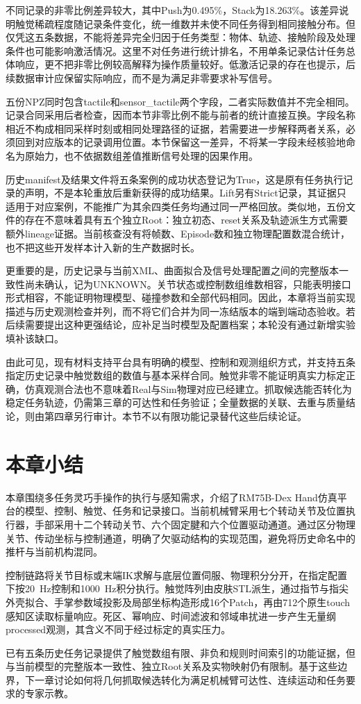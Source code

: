 不同记录的非零比例差异较大，其中Push为0.495\%，Stack为18.263\%。该差异说明触觉稀疏程度随记录条件变化，统一维数并未使不同任务得到相同接触分布。但仅凭这五条数据，不能将差异完全归因于任务类型：物体、轨迹、接触阶段及处理条件也可能影响激活情况。这里不对任务进行统计排名，不用单条记录估计任务总体响应，更不把非零比例较高解释为操作质量较好。低激活记录的存在也提示，后续数据审计应保留实际响应，而不是为满足非零要求补写信号。

五份NPZ同时包含tactile和sensor\_tactile两个字段，二者实际数值并不完全相同。记录合同采用后者检查，因而本节非零比例不能与前者的统计直接互换。字段名称相近不构成相同采样时刻或相同处理路径的证据，若需要进一步解释两者关系，必须回到对应版本的记录调用位置。本节保留这一差异，不将某一字段未经核验地命名为原始力，也不依据数组差值推断信号处理的因果作用。

历史manifest及结果文件将五条案例的成功状态登记为True，这是原有任务执行记录的声明，不是本轮重放后重新获得的成功结果。Lift另有Strict记录，其证据只适用于对应案例，不能推广为其余四类任务均通过同一严格回放。类似地，五份文件的存在不意味着具有五个独立Root：独立初态、reset关系及轨迹派生方式需要额外lineage证据。当前核查没有将帧数、Episode数和独立物理配置数混合统计，也不把这些开发样本计入新的生产数据时长。

更重要的是，历史记录与当前XML、曲面拟合及信号处理配置之间的完整版本一致性尚未确认，记为UNKNOWN。关节状态或控制数组维数相容，只能表明接口形式相容，不能证明物理模型、碰撞参数和全部代码相同。因此，本章将当前实现描述与历史观测检查并列，而不将它们合并为同一冻结版本的端到端动态验收。若后续需要提出这种更强结论，应补足当时模型及配置档案；本轮没有通过新增实验填补该缺口。

由此可见，现有材料支持平台具有明确的模型、控制和观测组织方式，并支持五条指定历史记录中触觉数组的数值与基本采样合同。触觉非零不能证明真实力标定正确，仿真观测合法也不意味着Real与Sim物理对应已经建立。抓取候选能否转化为稳定任务轨迹，仍需第三章的可达性和任务验证；全量数据的关联、去重与质量结论，则由第四章另行审计。本节不以有限功能记录替代这些后续论证。

\section{本章小结}
\label{sec:platform_summary}

本章围绕多任务灵巧手操作的执行与感知需求，介绍了RM75B-Dex Hand仿真平台的模型、控制、触觉、任务和记录接口。当前机械臂采用七个转动关节及位置执行器，手部采用十二个转动关节、六个固定腱和六个位置驱动通道。通过区分物理关节、传动坐标与控制通道，明确了欠驱动结构的实现范围，避免将历史命名中的推杆与当前机构混同。

控制链路将关节目标或末端IK求解与底层位置伺服、物理积分分开，在指定配置下按20~Hz控制和1000~Hz积分执行。触觉阵列由皮肤STL派生，通过指节与指尖外壳拟合、手掌参数域投影及局部坐标构造形成16个Patch，再由712个原生touch感知区读取标量响应。死区、幂响应、时间滤波和邻域串扰进一步产生无量纲processed观测，其含义不同于经过标定的真实压力。

已有五条历史任务记录提供了触觉数组有限、非负和规则时间索引的功能证据，但与当前模型的完整版本一致性、独立Root关系及实物映射仍有限制。基于这些边界，下一章讨论如何将几何抓取候选转化为满足机械臂可达性、连续运动和任务要求的专家示教。
